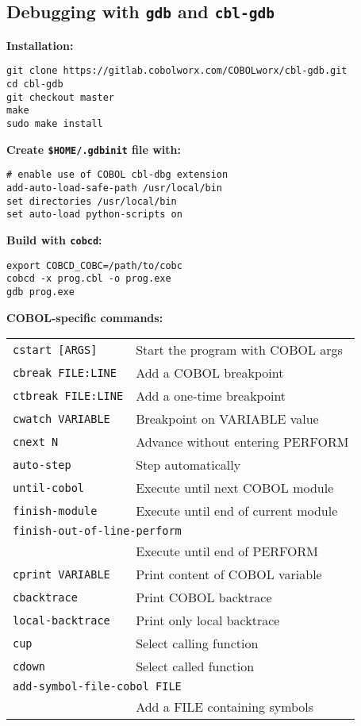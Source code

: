 \documentclass[10pt,landscape]{article}
\begin{document}
\begin{multicols}{3}
    \subsection{Debugging with {\tt gdb} and {\tt cbl-gdb}}

{\bf Installation:}\vspace{-3mm}
\begin{verbatim}
git clone https://gitlab.cobolworx.com/COBOLworx/cbl-gdb.git
cd cbl-gdb
git checkout master
make
sudo make install
\end{verbatim}\vspace{-2mm}
{\bf Create \verb+$HOME/.gdbinit+ file with:}\vspace{-3mm}
\begin{verbatim}
# enable use of COBOL cbl-dbg extension
add-auto-load-safe-path /usr/local/bin
set directories /usr/local/bin
set auto-load python-scripts on
\end{verbatim}\vspace{-2mm}

{\bf Build with \verb+cobcd+:}\vspace{-3mm}
\begin{verbatim}
export COBCD_COBC=/path/to/cobc
cobcd -x prog.cbl -o prog.exe
gdb prog.exe
\end{verbatim}\vspace{-2mm}
{\bf COBOL-specific commands:}
\begin{tabular}{ll}
\verb+cstart [ARGS]+ & Start the program with COBOL args \\
\verb+cbreak FILE:LINE+ & Add a COBOL breakpoint \\
\verb+ctbreak FILE:LINE+ & Add a one-time breakpoint \\
\verb+cwatch VARIABLE+ & Breakpoint on VARIABLE value \\
\verb+cnext N+ & Advance without entering PERFORM \\
\verb+auto-step+ & Step automatically \\
\verb+until-cobol+ & Execute until next COBOL module\\
\verb+finish-module+ & Execute until end of current module\\
\multicolumn{2}{l}{\tt finish-out-of-line-perform} \\
   & Execute until end of PERFORM \\
\verb+cprint VARIABLE+ & Print content of COBOL variable \\
\verb+cbacktrace+ & Print COBOL backtrace \\
\verb+local-backtrace+ & Print only local backtrace \\
\verb+cup+ & Select calling function\\
\verb+cdown+ & Select called function \\
\multicolumn{2}{l}{\tt add-symbol-file-cobol FILE} \\
  & Add a FILE containing symbols \\
\end{tabular}


\end{multicols}
\end{document}
